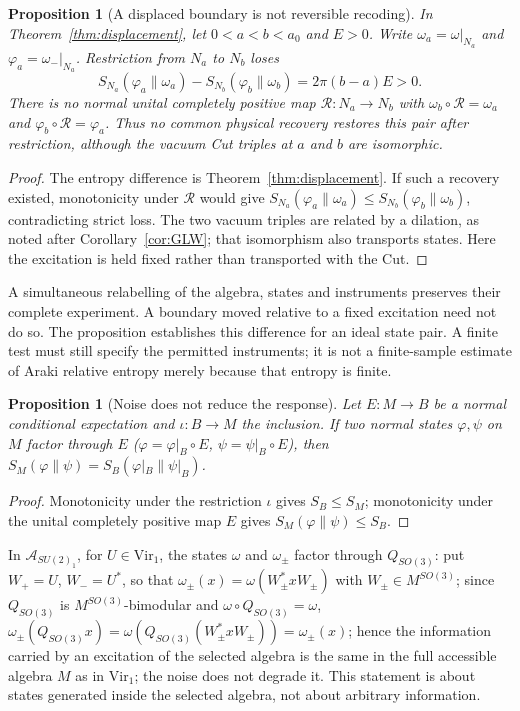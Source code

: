 \documentclass[12pt]{article}
\newtheorem{proposition}[theorem]{Proposition}
\theoremstyle{definition}
\theoremstyle{remark}
\begin{document}
\begin{proposition}[A displaced boundary is not reversible recoding]
\label{prop:access-recoding}
In Theorem~\ref{thm:displacement}, let \(0<a<b<a_0\) and \(E>0\).
Write \(\omega_a=\omega|_{N_a}\) and
\(\varphi_a=\omega_-|_{N_a}\). Restriction from \(N_a\) to \(N_b\)
loses
\[
 S_{N_a}(\varphi_a\|\omega_a)-S_{N_b}(\varphi_b\|\omega_b)
       =2\pi(b-a)E>0 .
\]
There is no normal unital completely positive map
\(\mathcal R:N_a\to N_b\) with
\(\omega_b\circ\mathcal R=\omega_a\) and
\(\varphi_b\circ\mathcal R=\varphi_a\).
Thus no common physical recovery restores this pair after restriction,
although the vacuum Cut triples at \(a\) and \(b\) are isomorphic.
\end{proposition}
\begin{proof}
The entropy difference is Theorem~\ref{thm:displacement}.
If such a recovery existed, monotonicity under \(\mathcal R\)
would give
\(S_{N_a}(\varphi_a\|\omega_a)\le
  S_{N_b}(\varphi_b\|\omega_b)\), contradicting strict loss.
The two vacuum triples are related by a dilation, as noted after
Corollary~\ref{cor:GLW}; that isomorphism also transports states.
Here the excitation is held fixed rather than transported with the Cut.
\end{proof}

A simultaneous relabelling of the algebra, states and instruments
preserves their complete experiment. A boundary moved relative to a
fixed excitation need not do so. The proposition establishes this
difference for an ideal state pair. A finite test must still specify
the permitted instruments; it is not a finite-sample estimate of Araki
relative entropy merely because that entropy is finite.

\begin{proposition}[Noise does not reduce the response]\label{prop:Fprime}
Let \(E:M\to B\) be a normal conditional expectation and \(\iota:B\to M\) the
inclusion. If two normal states \(\varphi,\psi\) on \(M\) factor through \(E\)
(\(\varphi=\varphi|_B\circ E\), \(\psi=\psi|_B\circ E\)), then
\(S_M(\varphi\|\psi)=S_B(\varphi|_B\|\psi|_B)\).
\end{proposition}
\begin{proof}
Monotonicity under the restriction \(\iota\) gives \(S_B\le S_M\); monotonicity under
the unital completely positive map \(E\) gives \(S_M(\varphi\|\psi)\le S_B\).
\end{proof}
In \(\mathcal A_{SU(2)_1}\), for \(U\in\mathrm{Vir}_1\), the states \(\omega\) and
\(\omega_\pm\) factor through \(Q_{SO(3)}\): put \(W_+=U\), \(W_-=U^*\), so that
\(\omega_\pm(x)=\omega(W_\pm^*xW_\pm)\) with \(W_\pm\in M^{SO(3)}\); since \(Q_{SO(3)}\) is
\(M^{SO(3)}\)-bimodular and \(\omega\circ Q_{SO(3)}=\omega\),
\(\omega_\pm(Q_{SO(3)}x)=\omega(Q_{SO(3)}(W_\pm^*xW_\pm))=\omega_\pm(x)\); hence the information
carried by an excitation of the selected algebra is the same in the full accessible
algebra \(M\) as in \(\mathrm{Vir}_1\); the noise does not degrade it. This statement is
about states generated inside the selected algebra, not about arbitrary information.
\end{document}
